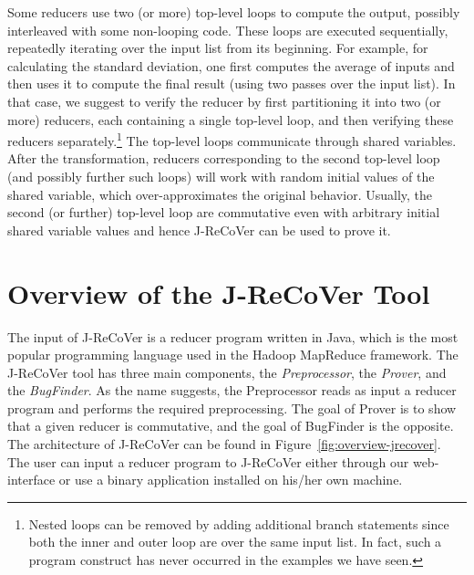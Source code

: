 \documentclass{llncs}
\begin{document}
Some reducers use two (or more) top-level loops to compute the output, possibly
interleaved with some non-looping code. These loops are executed sequentially,
repeatedly iterating over the input list from its beginning. For example, for
calculating the standard deviation, one first computes the average of inputs and
then uses it to compute the final result (using two passes over the input list).
In that case, we suggest to verify the reducer by first partitioning it into two
(or more) reducers, each containing a single top-level loop, and then verifying
these reducers separately.\footnote{Nested loops can be removed by adding
additional branch statements since both the inner and outer loop are over the
same input list. In fact, such a program construct has never occurred in the
examples we have seen.} The top-level loops communicate through shared
variables. After the transformation, reducers corresponding to the second
top-level loop (and possibly further such loops) will work with random initial
values of the shared variable, which over-approximates the original behavior.
Usually, the second (or further) top-level loop are commutative even with
arbitrary initial shared variable values and hence J-ReCoVer can be used to
prove it.


\vspace*{-2mm}
\section{Overview of the J-ReCoVer Tool} \label{sec:overview}
\vspace*{-1mm}


The input of J-ReCoVer is a reducer program written in Java, which is the most
popular programming language used in the Hadoop MapReduce
framework. The J-ReCoVer tool has three main components, the
\emph{Preprocessor}, the \emph{Prover}, and the \emph{BugFinder}. As the name
suggests, the Preprocessor reads as input a reducer program and performs the
required preprocessing. The goal of Prover is to show that a given reducer is
commutative, and the goal of BugFinder is the opposite. The architecture of
J-ReCoVer can be found in Figure~\ref{fig:overview-jrecover}. The user can input
a reducer program to J-ReCoVer either through our web-interface or use a binary
application installed on his/her own machine.
\end{document}
